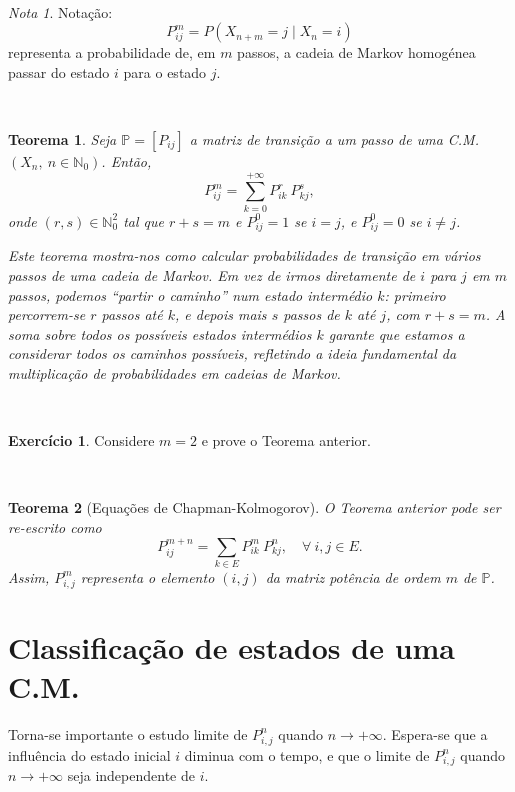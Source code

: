 \documentclass[
  11pt,
  a4paper,
]{book}
\newtheorem{theorem}{Teorema}[chapter]
\theoremstyle{definition}
\theoremstyle{definition}
\theoremstyle{definition}
\newtheorem{exercise}{Exercício}[chapter]
\theoremstyle{definition}
\theoremstyle{remark}
\newtheorem*{remark}{Nota }
\begin{document}
\(\,\)

\begin{remark}
Notação:
\[P^m_{ij}=P(X_{n+m}=j \mid X_n=i)\]
representa a probabilidade de, em \(m\) passos, a cadeia de Markov homogénea passar do estado \(i\) para o estado \(j\).
\end{remark}

\(\,\)

\begin{theorem}
Seja \(\mathbb{P}=[P_{ij}]\) a matriz de transição a um passo de uma C.M. \((X_n, ~n \in \mathbb{N}_0)\). Então,
\[P^m_{ij}=\sum\limits_{k=0}^{+\infty}P_{ik}^r ~ P_{kj}^s,\]
onde \((r,s) \in \mathbb{N}_0^2\) tal que \(r+s=m\) e \(P_{ij}^0=1\) se \(i=j\), e \(P_{ij}^0=0\) se \(i \neq j\).

Este teorema mostra-nos como calcular probabilidades de transição em vários passos de uma cadeia de Markov. Em vez de irmos diretamente de \(i\) para \(j\) em \(m\) passos, podemos ``partir o caminho'' num estado intermédio \(k\): primeiro percorrem-se \(r\) passos até \(k\), e depois mais \(s\) passos de \(k\) até \(j\), com \(r+s=m\). A soma sobre todos os possíveis estados intermédios \(k\) garante que estamos a considerar todos os caminhos possíveis, refletindo a ideia fundamental da multiplicação de probabilidades em cadeias de Markov.
\end{theorem}

\(\,\)

\begin{exercise}
\leavevmode

Considere \(m=2\) e prove o Teorema anterior.

\end{exercise}

\(\,\)

\begin{theorem}[Equações de Chapman-Kolmogorov]
O Teorema anterior pode ser re-escrito como
\[P^{m+n}_{ij}=\sum\limits_{k \in E}P_{ik}^m ~ P_{kj}^n, \quad \forall ~i,j \in E.\]
Assim, \(P_{i,j}^m\) representa o elemento \((i,j)\) da matriz potência de ordem \(m\) de \(\mathbb{P}\).
\end{theorem}

\section{Classificação de estados de uma C.M.}\label{classificacao-de-estados-de-uma-c-m}

Torna-se importante o estudo limite de \(P_{i,j}^n\) quando \(n \to +\infty\). Espera-se que a influência do estado inicial \(i\) diminua com o tempo, e que o limite de \(P_{i,j}^n\) quando \(n \to +\infty\) seja independente de \(i\).
\end{document}
